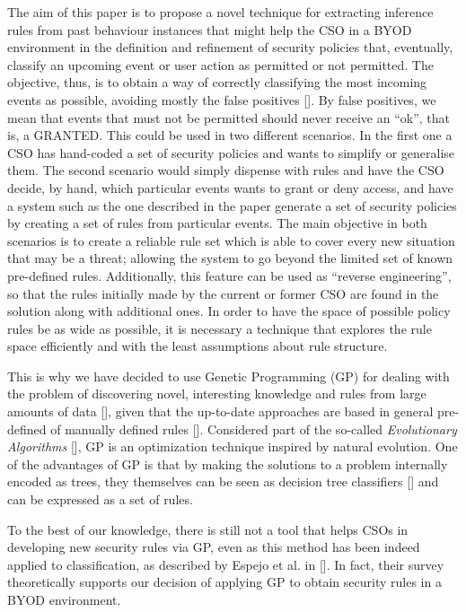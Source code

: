 The aim of this paper is to propose a novel technique for extracting
inference rules from past behaviour instances 
that might help the CSO in a BYOD environment in the definition and refinement
of security policies that, eventually, classify an upcoming
event or user action as permitted or not permitted. The objective, thus, is to obtain a way of correctly classifying the most incoming events as possible, avoiding mostly the false positives [\cite{pietraszek2005data}]. By false positives, we mean that events that must not be permitted should never receive an ``ok'', that is, a GRANTED. 
This could be used
in two different scenarios. In the first one a CSO has hand-coded a set of security
policies and wants to simplify or generalise them. The second scenario 
would simply dispense with rules and have the CSO decide, by hand, which
particular events wants to grant or deny access, and have a system such
as the one described in the paper generate a set of security policies
by creating a set of rules from particular events. 
The main objective in both scenarios is to create a reliable rule set
which is able to cover every new situation that may be a threat;
allowing the system to go beyond the limited set of known pre-defined
rules. Additionally, this feature can be used as ``reverse
engineering'', so that the rules initially made by the current or
former CSO are found in the solution along with additional ones. In
order to have the space of possible policy rules be as wide 
as possible, it is necessary a technique that explores the rule space
efficiently and with the least assumptions about rule structure.

This is why we have decided to use Genetic Programming (GP) for dealing with the problem of
discovering novel, interesting knowledge and rules from large
amounts of data [\cite{freitas2002data}], given that the up-to-date approaches are based in general pre-defined of manually defined rules [\cite{ali2015analysis}]. Considered part of the so-called \emph{Evolutionary
  Algorithms} [\cite{back1996evolutionary}], GP is an optimization
technique inspired by natural evolution. One of the advantages of GP is that by making the
solutions to a problem internally encoded as trees, they themselves can be
seen as decision tree classifiers [\cite{safavian1990survey}] and can be expressed as a set of rules.

To the best of our knowledge, there is still not a tool that helps CSOs in
developing new security rules via GP, even as this method has been
indeed applied to classification, as described by Espejo et al. in
[\cite{espejo2010survey}]. In fact, their survey theoretically supports our
decision of applying GP to obtain security rules in a BYOD
environment.

